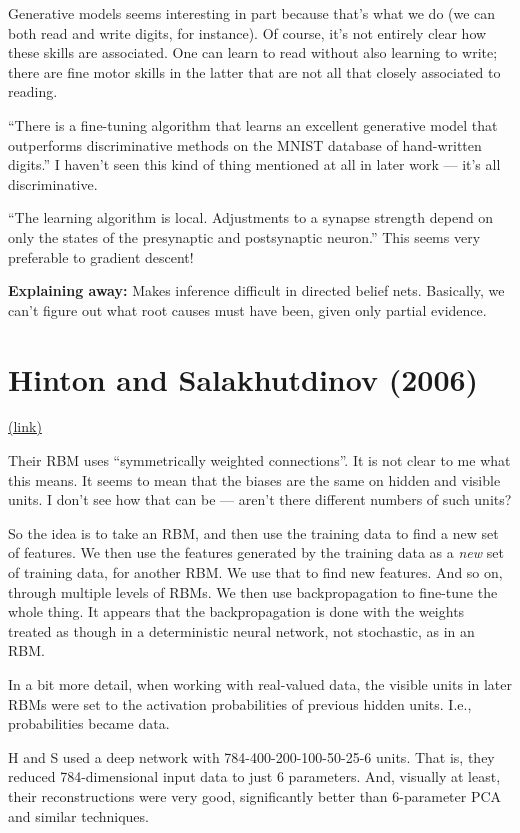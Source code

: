 \documentclass[12pt]{report}
\newcommand{\link}[2]{\href{#1}{#2}}
\begin{document}
Generative models seems interesting in part because that's what we do
(we can both read and write digits, for instance).  Of course, it's
not entirely clear how these skills are associated.  One can learn to
read without also learning to write; there are fine motor skills in
the latter that are not all that closely associated to reading.

``There is a fine-tuning algorithm that learns an excellent generative
model that outperforms discriminative methods on the MNIST database of
hand-written digits.''  I haven't seen this kind of thing mentioned at
all in later work --- it's all discriminative.

``The learning algorithm is local.  Adjustments to a synapse strength
depend on only the states of the presynaptic and postsynaptic
neuron.''  This seems very preferable to gradient descent!

\textbf{Explaining away:} Makes inference difficult in directed belief
nets.  Basically, we can't figure out what root causes must have been,
given only partial evidence.

\section{Hinton and Salakhutdinov (2006)}

\link{http://scholar.google.ca/scholar?cluster=15344645275208957628}{(link)}

Their RBM uses ``symmetrically weighted connections''.  It is not
clear to me what this means.  It seems to mean that the biases are the
same on hidden and visible units.  I don't see how that can be ---
aren't there different numbers of such units?

So the idea is to take an RBM, and then use the training data to find
a new set of features.  We then use the features generated by the
training data as a \emph{new} set of training data, for another RBM.
We use that to find new features.  And so on, through multiple levels
of RBMs.  We then use backpropagation to fine-tune the whole thing.
It appears that the backpropagation is done with the weights treated
as though in a deterministic neural network, not stochastic, as in an
RBM.

In a bit more detail, when working with real-valued data, the visible
units in later RBMs were set to the activation probabilities of
previous hidden units.  I.e., probabilities became data.

H and S used a deep network with 784-400-200-100-50-25-6 units.  That
is, they reduced 784-dimensional input data to just 6 parameters.
And, visually at least, their reconstructions were very good,
significantly better than 6-parameter PCA and similar techniques.
\end{document}
